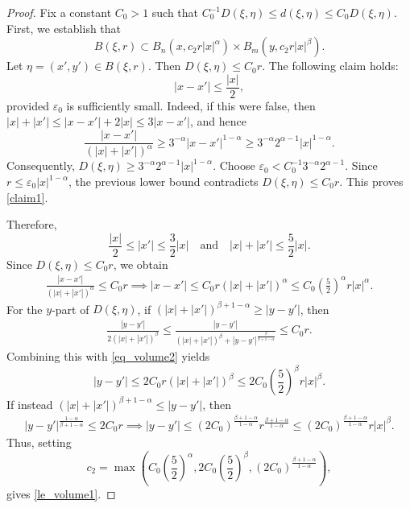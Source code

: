 \documentclass[12pt]{amsart}
\begin{document}
\begin{proof}
Fix a constant $C_0>1$ such that $C_0^{-1} D(\xi,\eta) \le d(\xi,\eta) \le C_0 D(\xi,\eta)$. First, we establish that
\begin{equation}\label{le_volume1}
B(\xi, r) \subset B_n(x, c_2 r |x|^\alpha) \times B_m(y, c_2 r |x|^\beta).
\end{equation}
Let $\eta = (x',y')\in B(\xi, r)$. Then $D(\xi,\eta)\le C_0 r$. The following claim holds:
\begin{equation}\label{claim1}
|x-x'| \le \frac{|x|}{2},
\end{equation}
provided $\varepsilon_0$ is sufficiently small. Indeed, if this were false, then $|x|+|x'|\le |x-x'| + 2|x| \le 3|x-x'|$, and hence
\begin{equation*}
\frac{|x-x'|}{\left(|x|+|x'|\right)^\alpha} \ge 3^{-\alpha} |x-x'|^{1-\alpha} \ge 3^{-\alpha} 2^{\alpha-1} |x|^{1-\alpha}.
\end{equation*}
Consequently, $D(\xi,\eta)\ge 3^{-\alpha} 2^{\alpha-1} |x|^{1-\alpha}$. Choose $\varepsilon_0 < C_0^{-1} 3^{-\alpha} 2^{\alpha-1}$. Since $r\le \varepsilon_0 |x|^{1-\alpha}$, the previous lower bound contradicts $D(\xi,\eta)\le C_0 r$. This proves \eqref{claim1}.

Therefore,
\begin{equation}\label{eq_volume2}
\frac{|x|}{2} \le |x'| \le \frac{3}{2}|x|\quad \textrm{and}\quad |x|+|x'| \le \frac{5}{2} |x|.
\end{equation}
Since $D(\xi,\eta)\le C_0 r$, we obtain
\begin{align*}
\frac{|x-x'|}{\left(|x|+|x'|\right)^\alpha} \le C_0 r \implies |x-x'|\le C_0 r \left(|x|+|x'|\right)^\alpha \le C_0 \left(\frac{5}{2}\right)^\alpha r |x|^\alpha.
\end{align*}
For the $y$-part of $D(\xi,\eta)$, if $\left(|x|+|x'|\right)^{\beta+1-\alpha}\ge |y-y'|$, then
\begin{align*}
\frac{|y-y'|}{2\left(|x|+|x'|\right)^{\beta}} \le \frac{|y-y'|}{\left(|x|+|x'|\right)^{\beta} + |y-y'|^{\frac{\beta}{\beta+1-\alpha}}} \le C_0 r.
\end{align*}
Combining this with \eqref{eq_volume2} yields
\begin{equation*}
|y-y'|\le 2C_0 r \left(|x|+|x'|\right)^{\beta} \le 2C_0 \left(\frac{5}{2}\right)^\beta r |x|^\beta.
\end{equation*}
If instead $\left(|x|+|x'|\right)^{\beta+1-\alpha}\le |y-y'|$, then
\begin{align*}
|y-y'|^{\frac{1-\alpha}{\beta+1-\alpha}} \le 2 C_0 r \implies |y-y'|\le \left(2C_0\right)^{\frac{\beta+1-\alpha}{1-\alpha}} r^{\frac{\beta+1-\alpha}{1-\alpha}}\le \left(2C_0\right)^{\frac{\beta+1-\alpha}{1-\alpha}} r |x|^{\beta}.
\end{align*}
Thus, setting
\begin{equation*}
c_2 = \max \left( C_0 \left(\frac{5}{2}\right)^\alpha,  2C_0 \left(\frac{5}{2}\right)^\beta, \left(2C_0\right)^{\frac{\beta+1-\alpha}{1-\alpha}} \right),
\end{equation*}
gives \eqref{le_volume1}.


\end{proof}
\end{document}
